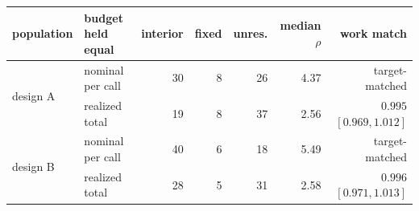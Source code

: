 \begin{tabular}{@{}l l r r r r r@{}}
\toprule
population & budget held equal & interior & fixed & unres. & median $\rho$ & work match \\
\midrule
\midrule
\multirow{2}{*}{design A} & nominal per call & 30 & 8 & 26 & 4.37 & target-matched \\
 & realized total & 19 & 8 & 37 & 2.56 & $0.995$ $[0.969,1.012]$ \\
\multirow{2}{*}{design B} & nominal per call & 40 & 6 & 18 & 5.49 & target-matched \\
 & realized total & 28 & 5 & 31 & 2.58 & $0.996$ $[0.971,1.013]$ \\
\bottomrule
\end{tabular}
